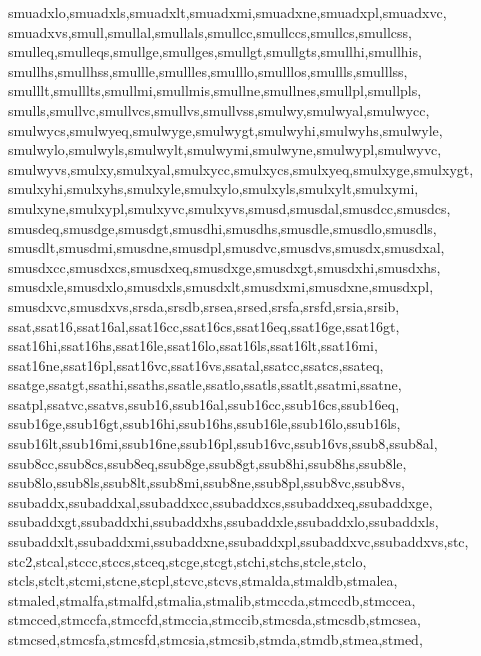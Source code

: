 {{      smuadxlo,smuadxls,smuadxlt,smuadxmi,smuadxne,smuadxpl,smuadxvc,         %
      smuadxvs,smull,smullal,smullals,smullcc,smullccs,smullcs,smullcss,      %
      smulleq,smulleqs,smullge,smullges,smullgt,smullgts,smullhi,smullhis,    %
      smullhs,smullhss,smullle,smullles,smulllo,smulllos,smullls,smulllss,    %
      smulllt,smulllts,smullmi,smullmis,smullne,smullnes,smullpl,smullpls,    %
      smulls,smullvc,smullvcs,smullvs,smullvss,smulwy,smulwyal,smulwycc,      %
      smulwycs,smulwyeq,smulwyge,smulwygt,smulwyhi,smulwyhs,smulwyle,         %
      smulwylo,smulwyls,smulwylt,smulwymi,smulwyne,smulwypl,smulwyvc,         %
      smulwyvs,smulxy,smulxyal,smulxycc,smulxycs,smulxyeq,smulxyge,smulxygt,  %
      smulxyhi,smulxyhs,smulxyle,smulxylo,smulxyls,smulxylt,smulxymi,         %
      smulxyne,smulxypl,smulxyvc,smulxyvs,smusd,smusdal,smusdcc,smusdcs,      %
      smusdeq,smusdge,smusdgt,smusdhi,smusdhs,smusdle,smusdlo,smusdls,        %
      smusdlt,smusdmi,smusdne,smusdpl,smusdvc,smusdvs,smusdx,smusdxal,        %
      smusdxcc,smusdxcs,smusdxeq,smusdxge,smusdxgt,smusdxhi,smusdxhs,         %
      smusdxle,smusdxlo,smusdxls,smusdxlt,smusdxmi,smusdxne,smusdxpl,         %
      smusdxvc,smusdxvs,srsda,srsdb,srsea,srsed,srsfa,srsfd,srsia,srsib,      %
      ssat,ssat16,ssat16al,ssat16cc,ssat16cs,ssat16eq,ssat16ge,ssat16gt,      %
      ssat16hi,ssat16hs,ssat16le,ssat16lo,ssat16ls,ssat16lt,ssat16mi,         %
      ssat16ne,ssat16pl,ssat16vc,ssat16vs,ssatal,ssatcc,ssatcs,ssateq,        %
      ssatge,ssatgt,ssathi,ssaths,ssatle,ssatlo,ssatls,ssatlt,ssatmi,ssatne,  %
      ssatpl,ssatvc,ssatvs,ssub16,ssub16al,ssub16cc,ssub16cs,ssub16eq,        %
      ssub16ge,ssub16gt,ssub16hi,ssub16hs,ssub16le,ssub16lo,ssub16ls,         %
      ssub16lt,ssub16mi,ssub16ne,ssub16pl,ssub16vc,ssub16vs,ssub8,ssub8al,    %
      ssub8cc,ssub8cs,ssub8eq,ssub8ge,ssub8gt,ssub8hi,ssub8hs,ssub8le,        %
      ssub8lo,ssub8ls,ssub8lt,ssub8mi,ssub8ne,ssub8pl,ssub8vc,ssub8vs,        %
      ssubaddx,ssubaddxal,ssubaddxcc,ssubaddxcs,ssubaddxeq,ssubaddxge,        %
      ssubaddxgt,ssubaddxhi,ssubaddxhs,ssubaddxle,ssubaddxlo,ssubaddxls,      %
      ssubaddxlt,ssubaddxmi,ssubaddxne,ssubaddxpl,ssubaddxvc,ssubaddxvs,stc,  %
      stc2,stcal,stccc,stccs,stceq,stcge,stcgt,stchi,stchs,stcle,stclo,       %
      stcls,stclt,stcmi,stcne,stcpl,stcvc,stcvs,stmalda,stmaldb,stmalea,      %
      stmaled,stmalfa,stmalfd,stmalia,stmalib,stmccda,stmccdb,stmccea,        %
      stmcced,stmccfa,stmccfd,stmccia,stmccib,stmcsda,stmcsdb,stmcsea,        %
      stmcsed,stmcsfa,stmcsfd,stmcsia,stmcsib,stmda,stmdb,stmea,stmed,        %
}}
